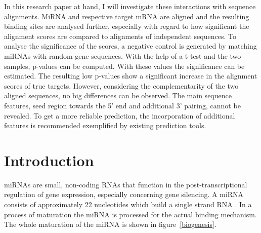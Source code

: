\documentclass[11pt, a4paper, twoside]{book}
\begin{document}
In this research paper at hand, I will investigate these interactions with sequence alignments. MiRNA and respective target mRNA are aligned and the resulting binding sites are analysed further, especially with regard to how significant the alignment scores are compared to alignments of independent sequences. To analyse the significance of the scores, a negative control is generated by matching miRNAs with random gene sequences. With the help of a t-test and the two samples, p-values can be computed. With these values the significance can be estimated. The resulting low p-values show a significant increase in the alignment scores of true targets. However, considering the complementarity of the two aligned sequences, no big differences can be observed. The main sequence features, seed region towards the 5' end and additional 3' pairing, cannot be revealed. To get a more reliable prediction, the incorporation of additional features is recommended exemplified by existing prediction tools.
 
\newpage
\mbox{}
\newpage

\tableofcontents

\newpage

\pagestyle{plain}






\chapter{Introduction}
\label{chapter:introduction}

miRNAs are small, non-coding RNAs that function in the post-transcriptional regulation of gene expression, especially concerning gene silencing. A miRNA consists of approximately 22 nucleotides which build a single strand RNA \cite{Bartel}. In a process of maturation the miRNA is processed for the actual binding mechanism. The whole maturation of the miRNA is shown in figure~\ref{biogenesis}.\\
\end{document}
